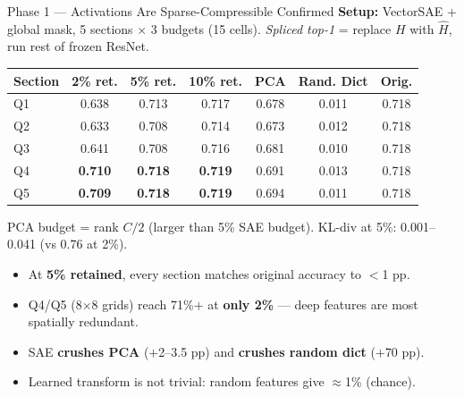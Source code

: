 \documentclass[final]{beamer}
\newlength{\colwidth}
\begin{document}
\begin{frame}[t]
\begin{columns}[t]
\begin{column}{\colwidth}
\vspace{0.5em}

\begin{block}{Phase 1 --- Activations Are Sparse-Compressible \textcolor{AccentGreen}{Confirmed}}
\small
\textbf{Setup:} VectorSAE + global mask, 5 sections $\times$ 3 budgets (15 cells).
\textit{Spliced top-1} = replace $H$ with $\hat{H}$, run rest of frozen ResNet.

\vspace{0.4em}
\begin{center}
\begin{tabular}{@{}lcccccc@{}}
\toprule
\textbf{Section} & \textbf{2\% ret.} & \textbf{5\% ret.} & \textbf{10\% ret.} & \textbf{PCA} & \textbf{Rand. Dict} & \textbf{Orig.} \\
\midrule
Q1 & 0.638 & 0.713 & 0.717 & 0.678 & 0.011 & 0.718 \\
Q2 & 0.633 & 0.708 & 0.714 & 0.673 & 0.012 & 0.718 \\
Q3 & 0.641 & 0.708 & 0.716 & 0.681 & 0.010 & 0.718 \\
Q4 & \textbf{0.710} & \textbf{0.718} & \textbf{0.719} & 0.691 & 0.013 & 0.718 \\
Q5 & \textbf{0.709} & \textbf{0.718} & \textbf{0.719} & 0.694 & 0.011 & 0.718 \\
\bottomrule
\end{tabular}
\end{center}
\vspace{0.2em}
{\scriptsize PCA budget = rank $C/2$ (larger than 5\% SAE budget). KL-div at 5\%: 0.001--0.041 (vs 0.76 at 2\%).}

\vspace{0.3em}
\begin{itemize}[leftmargin=1.5em, itemsep=1pt]
  \item At \textbf{5\% retained}, every section matches original accuracy to $<$1 pp.
  \item Q4/Q5 (8$\times$8 grids) reach 71\%$+$ at \textbf{only 2\%} --- deep features are most spatially redundant.
  \item SAE \textbf{crushes PCA} ($+$2--3.5 pp) and \textbf{crushes random dict} ($+$70 pp).
  \item Learned transform is not trivial: random features give $\approx$1\% (chance).
\end{itemize}
\end{block}

\vspace{0.5em}


\end{column}
\end{columns}
\end{frame}
\end{document}
